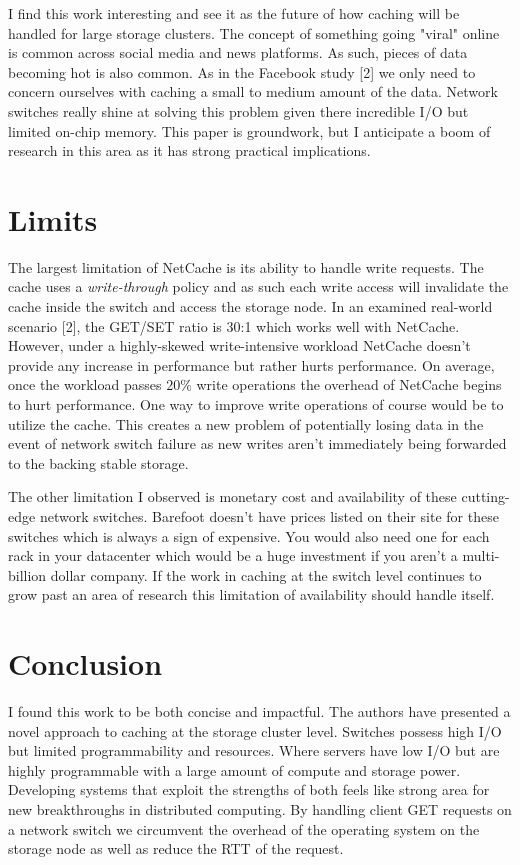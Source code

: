 \documentclass[11pt,twoside,twocolumn]{article}
\begin{document}
I find this work interesting and see it as the future of how caching will be handled for large storage clusters. The concept of something going "viral" online is common across social media and news platforms. As such, pieces of data becoming hot is also common. As in the Facebook study [2] we only need to concern ourselves with caching a small to medium amount of the data. Network switches really shine at solving this problem given there incredible I/O but limited on-chip memory. This paper is groundwork, but I anticipate a boom of research in this area as it has strong practical implications.

\section*{Limits}

The largest limitation of NetCache is its ability to handle write requests. The cache uses a \textit{write-through} policy and as such each write access will invalidate the cache inside the switch and access the storage node. In an examined real-world scenario [2], the GET/SET ratio is 30:1 which works well with NetCache. However, under a highly-skewed write-intensive workload NetCache doesn't provide any increase in performance but rather hurts performance. On average, once the workload passes $20\%$ write operations the overhead of NetCache begins to hurt performance. One way to improve write operations of course would be to utilize the cache. This creates a new problem of potentially losing data in the event of network switch failure as new writes aren't immediately being forwarded to the backing stable storage.

The other limitation I observed is monetary cost and availability of these cutting-edge network switches. Barefoot doesn't have prices listed on their site for these switches which is always a sign of expensive. You would also need one for each rack in your datacenter which would be a huge investment if you aren't a multi-billion dollar company. If the work in caching at the switch level continues to grow past an area of research this limitation of availability should handle itself.


\section*{Conclusion}

I found this work to be both concise and impactful. The authors have presented a novel approach to caching at the storage cluster level. Switches possess high I/O but limited programmability and resources. Where servers have low I/O but are highly programmable with a large amount of compute and storage power. Developing systems that exploit the strengths of both feels like strong area for new breakthroughs in distributed computing. By handling client GET requests on a network switch we circumvent the overhead of the operating system on the storage node as well as reduce the RTT of the request.
\end{document}
